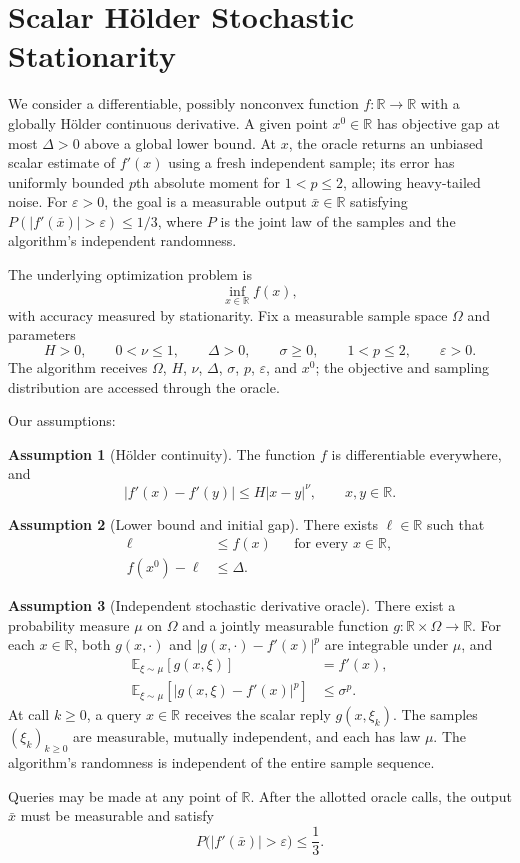 \documentclass[10pt]{article}
\theoremstyle{definition}
\newtheorem{assumption}{Assumption}
\begin{document}
\section*{Scalar H\"older Stochastic Stationarity}
We consider a differentiable, possibly nonconvex function $f:\mathbb{R}\to\mathbb{R}$ with a globally H\"older continuous derivative. A given point $x^0\in\mathbb{R}$ has objective gap at most $\Delta>0$ above a global lower bound. At $x$, the oracle returns an unbiased scalar estimate of $f'(x)$ using a fresh independent sample; its error has uniformly bounded $p$th absolute moment for $1<p\leq2$, allowing heavy-tailed noise. For $\varepsilon>0$, the goal is a measurable output $\bar{x}\in\mathbb{R}$ satisfying $P(|f'(\bar{x})|>\varepsilon)\leq1/3$, where $P$ is the joint law of the samples and the algorithm's independent randomness.

The underlying optimization problem is
\[
\inf_{x\in\mathbb{R}} f(x),
\]
with accuracy measured by stationarity. Fix a measurable sample space $\Omega$ and parameters
\[
H>0,\qquad 0<\nu\leq1,\qquad \Delta>0,\qquad
\sigma\geq0,\qquad 1<p\leq2,\qquad \varepsilon>0.
\]
The algorithm receives $\Omega$, $H$, $\nu$, $\Delta$, $\sigma$, $p$, $\varepsilon$, and $x^0$; the objective and sampling distribution are accessed through the oracle.

Our assumptions:
\begin{assumption}[H\"older continuity]
The function $f$ is differentiable everywhere, and
\[
|f'(x)-f'(y)|\leq H|x-y|^{\nu},
\qquad x,y\in\mathbb{R}.
\]
\end{assumption}

\begin{assumption}[Lower bound and initial gap]
There exists $\ell\in\mathbb{R}$ such that
\[
\begin{aligned}
\ell&\leq f(x) &&\text{for every }x\in\mathbb{R},\\
f(x^0)-\ell&\leq\Delta.
\end{aligned}
\]
\end{assumption}

\begin{assumption}[Independent stochastic derivative oracle]
There exist a probability measure $\mu$ on $\Omega$ and a jointly measurable function $g:\mathbb{R}\times\Omega\to\mathbb{R}$. For each $x\in\mathbb{R}$, both $g(x,\cdot)$ and $|g(x,\cdot)-f'(x)|^p$ are integrable under $\mu$, and
\[
\begin{aligned}
\mathbb{E}_{\xi\sim\mu}[g(x,\xi)]&=f'(x),\\
\mathbb{E}_{\xi\sim\mu}[|g(x,\xi)-f'(x)|^p]&\leq\sigma^p.
\end{aligned}
\]
At call $k\geq0$, a query $x\in\mathbb{R}$ receives the scalar reply $g(x,\xi_k)$. The samples $(\xi_k)_{k\geq0}$ are measurable, mutually independent, and each has law $\mu$. The algorithm's randomness is independent of the entire sample sequence.
\end{assumption}

Queries may be made at any point of $\mathbb{R}$. After the allotted oracle calls, the output $\bar{x}$ must be measurable and satisfy
\[
P\bigl(|f'(\bar{x})|>\varepsilon\bigr)\leq\frac{1}{3}.
\]
\end{document}

